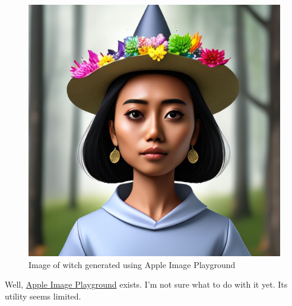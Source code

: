 \begin{figure}
\centering
\includegraphics[width=\textwidth,keepaspectratio]{imgplayground.jpg}
\caption{Image of witch generated using Apple Image Playground}
\end{figure}

Well, \href{https://www.macrumors.com/guide/image-playground/}{Apple
Image Playground} exists. I'm not sure what to do with it yet. Its
utility seems limited.
